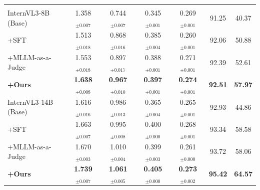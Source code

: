 \documentclass[letterpaper]{article} %
\begin{document}
\begin{table}[!t]
{\begin{tabular}{l|cccc|cc}
\midrule
\rowcolor{rowgray}
\multicolumn{7}{l}{\textit{InternVL3 series}} \\
InternVL3-8B (Base)
& 1.358$_{\pm0.007}$ & 0.744$_{\pm0.007}$ & 0.345$_{\pm0.001}$ & 0.269$_{\pm0.001}$ & 91.25 & 40.37 \\
\quad +SFT
& 1.513$_{\pm0.018}$ & 0.868$_{\pm0.016}$ & 0.385$_{\pm0.004}$ & 0.260$_{\pm0.001}$ & 92.06 & 50.88 \\
\quad +MLLM-as-a-Judge   
& 1.553$_{\pm0.018}$ & 0.897$_{\pm0.017}$ & 0.388$_{\pm0.001}$ & 0.271$_{\pm0.001}$ & 92.39 & 52.61 \\
\rowcolor{rowpink}
\quad \textbf{+Ours}         
& \textbf{1.638$_{\pm0.008}$} & \textbf{0.967$_{\pm0.010}$} & \textbf{0.397$_{\pm0.001}$} & \textbf{0.274$_{\pm0.001}$} & \textbf{92.51} & \textbf{57.97} \\
InternVL3-14B (Base)
& 1.616$_{\pm0.016}$ & 0.986$_{\pm0.013}$ & 0.365$_{\pm0.004}$ & 0.265$_{\pm0.001}$ & 92.93 & 44.86 \\
\quad +SFT
& 1.663$_{\pm0.007}$ & 0.995$_{\pm0.008}$ & 0.400$_{\pm0.000}$ & 0.268$_{\pm0.001}$ & 93.34 & 58.58 \\
\quad +MLLM-as-a-Judge          
& 1.670$_{\pm0.003}$ & 1.010$_{\pm0.004}$ & 0.399$_{\pm0.003}$ & 0.261$_{\pm0.000}$ & 93.72 & 58.06 \\
\rowcolor{rowpink}
\quad \textbf{+Ours}         
& \textbf{1.739$_{\pm0.007}$}
& \textbf{1.061$_{\pm0.005}$}
& \textbf{0.405$_{\pm0.000}$}
& \textbf{0.273$_{\pm0.002}$}
& \textbf{95.42}
& \textbf{64.57} \\
\bottomrule
\end{tabular}}
\end{table}


\end{document}
